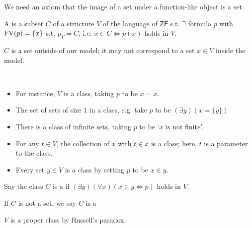 \begin{enumerate}
    We need an axiom that the image of a set under a function-like object is a set.


    \begin{definition}[Class]
        A  is a subset $C$ of a structure $V$ of the language of $\mathsf{ZF}$ s.t. $\exists$ formula $p$ with $\operatorname{FV}(p) = \{x\}$ s.t. $p_V = C$, i.e. $x \in C \iff p(x)$ holds in $V$.
    \end{definition}

    $C$ is a set outside of our model; it may not correspond to a set $x \in V$ inside the model.

    \begin{example} ~\vspace*{-1.5\baselineskip}
        \begin{itemize}
            \item For instance, $V$ is a class, taking $p$ to be $x = x$.
            \item The set of sets of size $1$ in a class, e.g. take $p$ to be $(\exists y)(x = \{y\})$
            \item There is a class of infinite sets, taking $p$ to be `$x$ is not finite'.
            \item For any $t \in V$, the collection of $x$ with $t \in x$ is a class; here, $t$ is a parameter to the class.
            \item Every set $y \in V$ is a class by setting $p$ to be $x \in y$.
        \end{itemize}
    \end{example}

    Say the class $C$ is a  if $(\exists y)(\forall x)(x \in y \iff p)$ holds in $V$.

    \begin{definition}
        If $C$ is not a set, we say $C$ is a 
    \end{definition}

    \begin{example}
        $V$ is a proper class by Russell's paradox.
    \end{example}


\end{enumerate}
